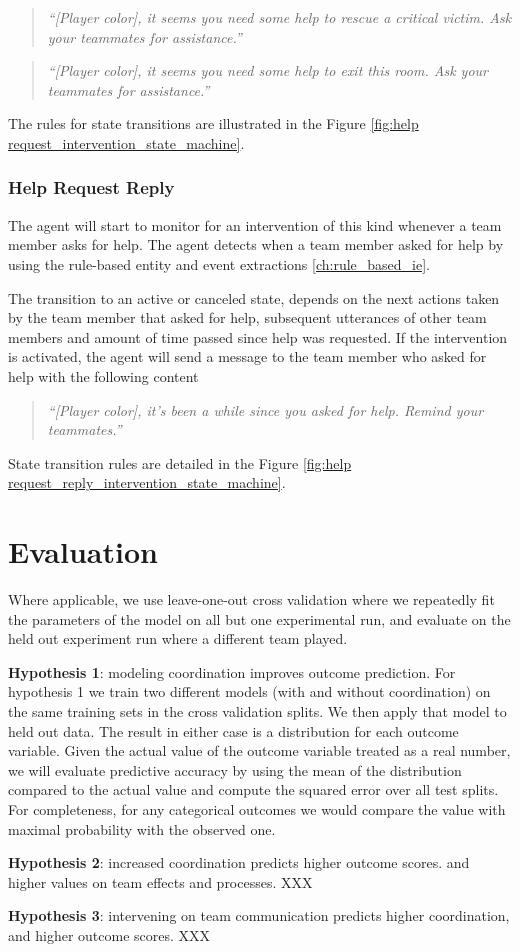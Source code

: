 \begin{quote} 
    \centering 
    \emph{``[Player color], it seems you need some help to rescue a critical victim. Ask your teammates for assistance.''}
\end{quote}

\begin{quote} 
    \centering 
    \emph{``[Player color], it seems you need some help to exit this room. Ask your teammates for assistance.''}
\end{quote}

The rules for state transitions are illustrated in the Figure \ref{fig:help request_intervention_state_machine}.

\subsubsection{Help Request Reply}

The agent will start to monitor for an intervention of this kind whenever a team member asks for help. The agent detects when a team member asked for help by using the rule-based entity and event extractions \ref{ch:rule_based_ie}.

The transition to an active or canceled state, depends on the next actions taken by the team member that asked for help, subsequent utterances of other team members and amount of time passed since help was requested. If the intervention is activated, the agent will send a message to the team member who asked for help with the following content

\begin{quote} 
    \centering 
    \emph{``[Player color], it's been a while since you asked for help. Remind your teammates.''}
\end{quote}

State transition rules are detailed in the Figure \ref{fig:help request_reply_intervention_state_machine}.

\section{Evaluation}

Where applicable, we use leave-one-out cross validation where we repeatedly fit the
parameters of the model on all but one experimental run, and evaluate on the
held out experiment run where a different team played. 

\textbf{Hypothesis 1}: modeling coordination improves outcome prediction.
For hypothesis 1 we train two different models (with and without coordination)
on the same training sets in the cross validation splits. We then apply that
model to held out data. The result in either case is a distribution for each
outcome variable. Given the actual value of the outcome variable treated as a
real number, we will evaluate predictive accuracy by using the mean of the
distribution compared to the actual value and compute the squared error over all
test splits. For completeness, for any categorical outcomes we would compare the
value with maximal probability with the observed one. 

\textbf{Hypothesis 2}: increased coordination predicts higher outcome scores.
and higher values on team effects and processes. XXX


\textbf{Hypothesis 3}: intervening on team communication predicts higher
coordination, and higher outcome scores. XXX


